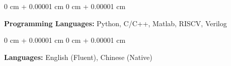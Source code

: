\documentclass[10pt, letterpaper]{article}
\newenvironment{onecolentry}{
    \begin{adjustwidth}{
        0 cm + 0.00001 cm
    }{
        0 cm + 0.00001 cm
    }
}{
    \end{adjustwidth}
} %
\begin{document}
        \vspace{0.2 cm}

        \begin{onecolentry}
            \textbf{Programming Languages:} Python, C/C++, Matlab, RISCV, Verilog
        \end{onecolentry}

        \vspace{0.2 cm}

        \begin{onecolentry}
            \textbf{Languages:} English (Fluent), Chinese (Native)
        \end{onecolentry}

    
\end{document}
